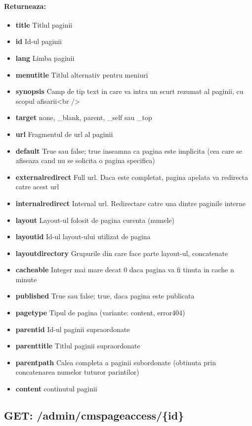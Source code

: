 \paragraph{Returneaza:}
\begin{itemize}
\item \textbf{title}
 Titlul paginii
\item \textbf{id}
 Id-ul paginii
\item \textbf{lang}
 Limba paginii
\item \textbf{menutitle}
 Titlul alternativ pentru meniuri
\item \textbf{synopsis}
 Camp de tip text in care va intra un scurt rezumat al paginii, cu scopul afisarii<br />
\item \textbf{target}
 none, \_blank, parent, \_self sau \_top
\item \textbf{url}
 Fragmentul de url al paginii
\item \textbf{default}
 True sau false; true inseamna ca pagina este implicita (cea care se afiseaza cand nu se solicita o pagina specifica)
\item \textbf{externalredirect}
 Full url. Daca este completat, pagina apelata va redirecta catre acest url 
\item \textbf{internalredirect}
 Internal url. Redirectare catre una dintre paginile interne
\item \textbf{layout}
 Layout-ul folosit de pagina curenta (numele)
\item \textbf{layoutid}
 Id-ul layout-ului utilizat de pagina
\item \textbf{layoutdirectory}
 Grupurile din care face parte layout-ul, concatenate
\item \textbf{cacheable}
 Integer mai mare decat 0 daca pagina va fi tinuta in cache n minute
\item \textbf{published}
 True sau false; true, daca pagina este publicata
\item \textbf{pagetype}
 Tipul de pagina (variante: content, error404)
\item \textbf{parentid}
 Id-ul paginii supraordonate
\item \textbf{parenttitle}
 Titlul paginii supraordonate
\item \textbf{parentpath}
 Calea completa a paginii subordonate (obtinuta prin concatenarea numelor tuturor parintilor)
\item \textbf{content}
 continutul paginii
 \end{itemize}
 \subsection*{GET: /admin/cmspageaccess/\{id\}}


